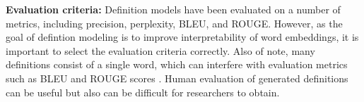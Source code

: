 \textbf{Evaluation criteria:} Definition models have been evaluated on a
number of metrics, including precision, perplexity, BLEU, and ROUGE. However,
as the goal of defintion modeling is to improve interpretability of word
embeddings, it is important to select the evaluation criteria correctly. Also of
note, many definitions consist of a single word, which can interfere with
evaluation metrics such as BLEU and ROUGE scores \cite{mickus_mark_2019}. Human
evaluation of generated definitions can be useful but also can be difficult for
researchers to obtain.
